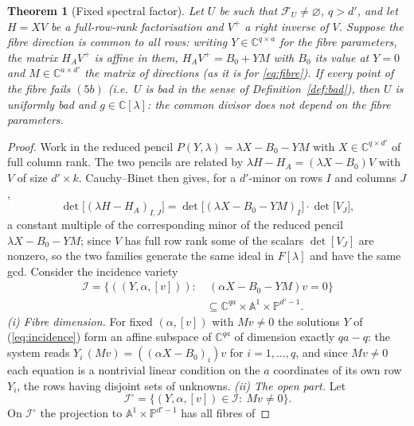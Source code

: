 \documentclass[journal]{IEEEtran}
\theoremstyle{plainn}
\newtheorem{thm}{Theorem}
\theoremstyle{remark}
\begin{document}
\begin{thm}[Fixed spectral factor]\label{thm:factor}
Let $U$ be such that $\mathcal F_U\ne\varnothing$, $q>d'$, and let $H=XV$ be a full-row-rank factorisation and $V^{+}$ a right inverse of $V$. Suppose the fibre direction is common to all rows: writing $Y\in\mathbb C^{q\times a}$ for the fibre
parameters, the matrix $H_AV^{+}$ is affine in them, $H_AV^{+}=B_0+YM$ with $B_0$ its value at $Y=0$ and
$M\in\mathbb C^{a\times d'}$ the matrix of directions (as it is for \eqref{eq:fibre}). If every point of the fibre fails $(5b)$ (i.e.\ $U$ is bad in the sense of Definition~\ref{def:bad}),
then $U$ is uniformly bad and $g\in\mathbb C[\lambda]$: the common divisor does not depend on the fibre
parameters.
\end{thm}

\begin{proof}
Work in the reduced pencil $P(Y,\lambda)=\lambda X-B_0-YM$ with $X\in\mathbb C^{q\times d'}$ of full
column rank. The two pencils are related by $\lambda H-H_A=(\lambda X-B_0)V$ with $V$ of size $d'\times k$. Cauchy--Binet
then gives, for a $d'$-minor on rows $I$ and columns $J$,
$$\det\bigl[(\lambda H-H_A)_{I,J}\bigr]=\det\bigl[(\lambda X-B_0-YM)_{I}\bigr]\cdot\det\bigl[V_{J}\bigr],$$
a constant multiple of the corresponding minor of the reduced pencil $\lambda X-B_0-YM$; since $V$ has full row rank some of the
scalars $\det[V_{J}]$ are nonzero, so the two families generate the same ideal in $F[\lambda]$ and have the
same gcd. Consider
the incidence variety
\begin{equation}\label{eq:incidence}
\begin{aligned}
\mathcal I=\{((Y,\alpha,[v])):&\ (\alpha X-B_0-YM)v=0\}\\
&\subseteq\mathbb C^{qa}\times\mathbb A^{1}\times\mathbb P^{d'-1}.
\end{aligned}
\end{equation}
\emph{(i) Fibre dimension.} For fixed $(\alpha,[v])$ with $Mv\ne0$
the solutions $Y$ of (\ref{eq:incidence}) form an affine subspace of $\mathbb C^{qa}$ of dimension
exactly $qa-q$: the system reads $Y_i\,(Mv)=((\alpha X-B_0)_i)v$ for $i=1,\dots,q$, and since
$Mv\neq0$ each equation is a nontrivial linear condition on the $a$ coordinates of its own row $Y_i$,
the rows having disjoint sets of unknowns. \emph{(ii) The open part.} Let
\begin{equation}\label{eq:Icirc}
\mathcal I^{\circ}=\{(Y,\alpha,[v])\in\mathcal I:\ Mv\ne0\}.
\end{equation}
On $\mathcal I^{\circ}$ the projection to $\mathbb A^{1}\times\mathbb P^{d'-1}$ has all fibres of

\end{proof}
\end{document}

